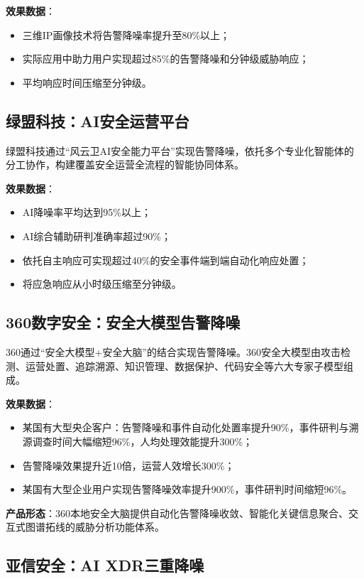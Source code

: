 \documentclass[11pt,a4paper]{article}
\begin{document}
\textbf{效果数据}：
\begin{itemize}
    \item 三维IP画像技术将告警降噪率提升至80\%以上；
    \item 实际应用中助力用户实现超过85\%的告警降噪和分钟级威胁响应；
    \item 平均响应时间压缩至分钟级。
\end{itemize}

\subsection{绿盟科技：AI安全运营平台}

绿盟科技通过“风云卫AI安全能力平台”实现告警降噪，依托多个专业化智能体的分工协作，构建覆盖安全运营全流程的智能协同体系。

\textbf{效果数据}：
\begin{itemize}
    \item AI降噪率平均达到95\%以上；
    \item AI综合辅助研判准确率超过90\%；
    \item 依托自主响应可实现超过40\%的安全事件端到端自动化响应处置；
    \item 将应急响应从小时级压缩至分钟级。
\end{itemize}

\subsection{360数字安全：安全大模型告警降噪}

360通过“安全大模型+安全大脑”的结合实现告警降噪。360安全大模型由攻击检测、运营处置、追踪溯源、知识管理、数据保护、代码安全等六大专家子模型组成。

\textbf{效果数据}：
\begin{itemize}
    \item 某国有大型央企客户：告警降噪和事件自动化处置率提升90\%，事件研判与溯源调查时间大幅缩短96\%，人均处理效能提升300\%；
    \item 告警降噪效果提升近10倍，运营人效增长300\%；
    \item 某国有大型企业用户实现告警降噪效率提升900\%，事件研判时间缩短96\%。
\end{itemize}

\textbf{产品形态}：360本地安全大脑提供自动化告警降噪收敛、智能化关键信息聚合、交互式图谱拓线的威胁分析功能体系。

\subsection{亚信安全：AI XDR三重降噪}
\end{document}
